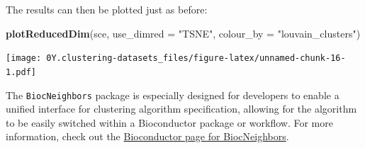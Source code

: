 \documentclass[]{book}
\newenvironment{Shaded}{\begin{snugshade}}{\end{snugshade}}
\newcommand{\DataTypeTok}[1]{\textcolor[rgb]{0.13,0.29,0.53}{#1}}
\newcommand{\KeywordTok}[1]{\textcolor[rgb]{0.13,0.29,0.53}{\textbf{#1}}}
\newcommand{\NormalTok}[1]{#1}
\newcommand{\StringTok}[1]{\textcolor[rgb]{0.31,0.60,0.02}{#1}}
\begin{document}
The results can then be plotted just as before:

\begin{Shaded}
\begin{Highlighting}[]
\KeywordTok{plotReducedDim}\NormalTok{(sce, }\DataTypeTok{use_dimred =} \StringTok{"TSNE"}\NormalTok{, }\DataTypeTok{colour_by =} \StringTok{"louvain_clusters"}\NormalTok{)}
\end{Highlighting}
\end{Shaded}

\texttt{[image: 0Y.clustering-datasets\_files/figure-latex/unnamed-chunk-16-1.pdf]}

The \texttt{BiocNeighbors} package is especially designed for developers to enable a unified interface for clustering algorithm specification, allowing for the algorithm to be easily switched within a Bioconductor package or workflow. For more information, check out the \href{https://bioconductor.org/packages/BiocNeighbors/}{Bioconductor page for BiocNeighbors}.


\end{document}
